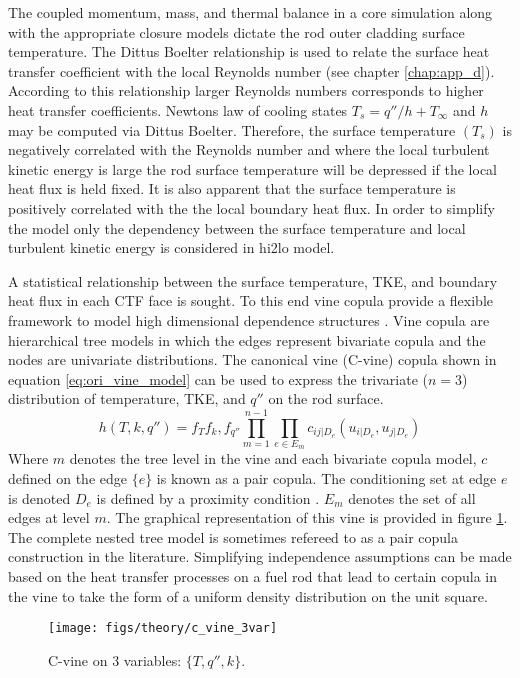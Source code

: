 The coupled momentum, mass, and thermal balance in a core simulation along with the appropriate closure models dictate the rod outer cladding surface temperature.  The Dittus Boelter relationship is used to relate the surface heat transfer coefficient with the local Reynolds number (see chapter \ref{chap:app_d}).  According to this relationship larger Reynolds numbers corresponds to higher heat transfer coefficients.   Newtons law of cooling states $T_s = q''/h + T_{\infty}$ and $h$ may be computed via Dittus Boelter.  Therefore, the surface temperature $(T_s)$ is negatively correlated with the Reynolds number and where the local turbulent kinetic energy is large the rod surface temperature will be depressed if the local heat flux is held fixed.  It is also apparent that the surface temperature is positively correlated with the the local boundary heat flux.  In order to simplify the model only the dependency between the surface temperature and local turbulent kinetic energy is considered in hi2lo model.

A statistical relationship between the surface temperature, TKE, and boundary heat flux in each CTF face is sought.  To this end vine copula provide a flexible framework to model high dimensional dependence structures \cite{Joe2015}. Vine copula are hierarchical tree models in which the edges represent bivariate copula and the nodes are univariate distributions.  The canonical vine (C-vine) copula shown in equation \ref{eq:ori_vine_model} can be used to express the trivariate ($n=3$) distribution of temperature, TKE, and $q''$ on the rod surface. 
\begin{equation}
h(T, k, q'') = f_T f_k, f_{q''} \prod_{m=1}^{n-1} \prod_{e \in E_m} c_{ij|D_e}(u_{i|D_e}, u_{j|D_e})
\label{eq:ori_vine_model}
\end{equation}
Where $m$ denotes the tree level in the vine and each bivariate copula model, $c$ defined on the edge $\{e\}$ is known as a pair copula.  The conditioning set at edge $e$ is denoted $D_e$ is defined by a proximity condition  \cite{bedford2001}. $E_m$ denotes the set of all edges at level $m$. The graphical representation of this vine is provided in figure \ref{fig:cvine3var}. The complete nested tree model is sometimes refereed to as a pair copula construction in the literature.  Simplifying independence assumptions can be made based on the heat transfer processes on a fuel rod that lead to certain copula in the vine to take the form of a uniform density distribution on the unit square.

\begin{figure}[H]
    \centering
    \texttt{[image: figs/theory/c\_vine\_3var]}
    \caption{C-vine on 3 variables: $\{T,q'',k\}$.}
    \label{fig:cvine3var}
\end{figure}


